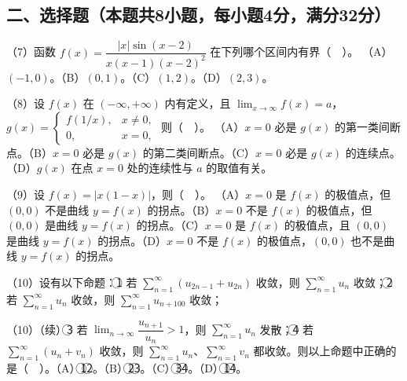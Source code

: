 \documentclass[UTF8,12pt]{ctexart}
\begin{document}
\subsection*{二、选择题（本题共8小题，每小题4分，满分32分）}

（7）函数 \(\displaystyle f(x)=\dfrac{\displaystyle |x|\sin(x-2)}{\displaystyle x(x-1)(x-2)^2}\) 在下列哪个区间内有界（　）。
（A）\(\displaystyle (-1,\allowbreak 0)\)。（B）\(\displaystyle (0,\allowbreak 1)\)。（C）\(\displaystyle (1,\allowbreak 2)\)。（D）\(\displaystyle (2,\allowbreak 3)\)。


（8）设 \(\displaystyle f(x)\) 在 \(\displaystyle (-\infty,\allowbreak +\infty)\) 内有定义，且 \(\displaystyle \lim_{x\to\infty}f(x)=a\)，\(\displaystyle g(x)=\begin{cases}f(1/x),\allowbreak &x\ne0,\allowbreak \\0,\allowbreak &x=0,\allowbreak \end{cases}\) 则（　）。
（A）\(\displaystyle x=0\) 必是 \(\displaystyle g(x)\) 的第一类间断点。（B）\(\displaystyle x=0\) 必是 \(\displaystyle g(x)\) 的第二类间断点。（C）\(\displaystyle x=0\) 必是 \(\displaystyle g(x)\) 的连续点。（D）\(\displaystyle g(x)\) 在点 \(\displaystyle x=0\) 处的连续性与 \(\displaystyle a\) 的取值有关。


（9）设 \(\displaystyle f(x)=|x(1-x)|\)，则（　）。
（A）\(\displaystyle x=0\) 是 \(\displaystyle f(x)\) 的极值点，但 \(\displaystyle (0,\allowbreak 0)\) 不是曲线 \(\displaystyle y=f(x)\) 的拐点。（B）\(\displaystyle x=0\) 不是 \(\displaystyle f(x)\) 的极值点，但 \(\displaystyle (0,\allowbreak 0)\) 是曲线 \(\displaystyle y=f(x)\) 的拐点。（C）\(\displaystyle x=0\) 是 \(\displaystyle f(x)\) 的极值点，且 \(\displaystyle (0,\allowbreak 0)\) 是曲线 \(\displaystyle y=f(x)\) 的拐点。（D）\(\displaystyle x=0\) 不是 \(\displaystyle f(x)\) 的极值点，\(\displaystyle (0,\allowbreak 0)\) 也不是曲线 \(\displaystyle y=f(x)\) 的拐点。


（10）设有以下命题：\textcircled{1} 若 \(\displaystyle \sum_{n=1}^{\infty}(u_{2n-1}+u_{2n})\) 收敛，则 \(\displaystyle \sum_{n=1}^{\infty}u_n\) 收敛；\textcircled{2} 若 \(\displaystyle \sum_{n=1}^{\infty}u_n\) 收敛，则 \(\displaystyle \sum_{n=1}^{\infty}u_{n+100}\) 收敛；


（10）（续）\textcircled{3} 若 \(\displaystyle \lim_{n\to\infty}\dfrac{\displaystyle u_{n+1}}{\displaystyle u_n}>1\)，则 \(\displaystyle \sum_{n=1}^{\infty}u_n\) 发散；\textcircled{4} 若 \(\displaystyle \sum_{n=1}^{\infty}(u_n+v_n)\) 收敛，则 \(\displaystyle \sum_{n=1}^{\infty}u_n\)、\(\displaystyle \sum_{n=1}^{\infty}v_n\) 都收敛。则以上命题中正确的是（　）。（A）\textcircled{1}\textcircled{2}。（B）\textcircled{2}\textcircled{3}。（C）\textcircled{3}\textcircled{4}。（D）\textcircled{1}\textcircled{4}。
\end{document}
